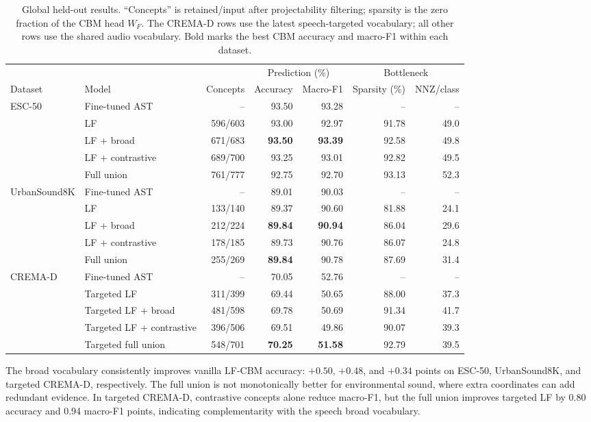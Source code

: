 \documentclass[10pt]{article}
\newcommand{\best}[1]{\textbf{#1}}
\begin{document}
\begin{table}[t]
\centering
\small
\caption{Global held-out results. ``Concepts'' is retained/input after projectability filtering; sparsity is the zero fraction of the CBM head $W_F$. The CREMA-D rows use the latest speech-targeted vocabulary; all other rows use the shared audio vocabulary. Bold marks the best CBM accuracy and macro-F1 within each dataset.}
\label{tab:global}
\setlength{\tabcolsep}{4.7pt}
\begin{tabular}{llr|rr|rr}
\toprule
& & & \multicolumn{2}{c|}{Prediction (\%)} & \multicolumn{2}{c}{Bottleneck} \\
\cmidrule(lr){4-5}\cmidrule(l){6-7}
Dataset & Model & Concepts & Accuracy & Macro-F1 & Sparsity (\%) & NNZ/class \\
\midrule
\multirow{5}{*}{ESC-50}
& Fine-tuned AST & -- & 93.50 & 93.28 & -- & -- \\
& LF & 596/603 & 93.00 & 92.97 & 91.78 & 49.0 \\
& LF + broad & 671/683 & \best{93.50} & \best{93.39} & 92.58 & 49.8 \\
& LF + contrastive & 689/700 & 93.25 & 93.01 & 92.82 & 49.5 \\
& Full union & 761/777 & 92.75 & 92.70 & 93.13 & 52.3 \\
\midrule
\multirow{5}{*}{UrbanSound8K}
& Fine-tuned AST & -- & 89.01 & 90.03 & -- & -- \\
& LF & 133/140 & 89.37 & 90.60 & 81.88 & 24.1 \\
& LF + broad & 212/224 & \best{89.84} & \best{90.94} & 86.04 & 29.6 \\
& LF + contrastive & 178/185 & 89.73 & 90.76 & 86.07 & 24.8 \\
& Full union & 255/269 & \best{89.84} & 90.78 & 87.69 & 31.4 \\
\midrule
\multirow{5}{*}{CREMA-D}
& Fine-tuned AST & -- & 70.05 & 52.76 & -- & -- \\
& Targeted LF & 311/399 & 69.44 & 50.65 & 88.00 & 37.3 \\
& Targeted LF + broad & 481/598 & 69.78 & 50.69 & 91.34 & 41.7 \\
& Targeted LF + contrastive & 396/506 & 69.51 & 49.86 & 90.07 & 39.3 \\
& Targeted full union & 548/701 & \best{70.25} & \best{51.58} & 92.79 & 39.5 \\
\bottomrule
\end{tabular}
\end{table}

The broad vocabulary consistently improves vanilla LF-CBM accuracy: $+0.50$, $+0.48$, and $+0.34$ points on ESC-50, UrbanSound8K, and targeted CREMA-D, respectively. The full union is not monotonically better for environmental sound, where extra coordinates can add redundant evidence. In targeted CREMA-D, contrastive concepts alone reduce macro-F1, but the full union improves targeted LF by 0.80 accuracy and 0.94 macro-F1 points, indicating complementarity with the speech broad vocabulary.
\end{document}
